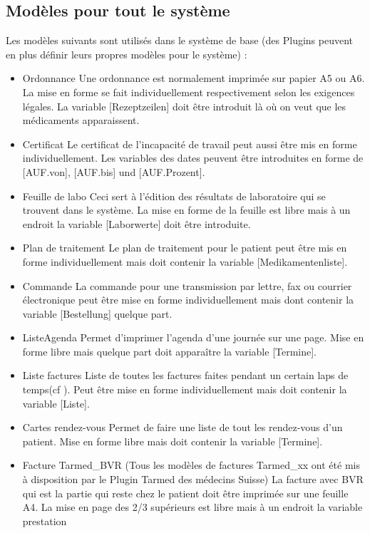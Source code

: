 \subsection{Modèles pour tout le système}
\label{systemvorlagen}
Les modèles suivants sont utilisés dans le système de base (des Plugins peuvent en plus définir leurs propres modèles pour le système) :
\begin{itemize}

  \item {Ordonnance} Une ordonnance est normalement imprimée sur papier A5 ou A6. La mise en forme se fait individuellement respectivement selon les exigences légales. La variable [Rezeptzeilen] doit être introduit là où on veut que les médicaments apparaissent.
  \item {Certificat} Le certificat de l'incapacité de travail peut aussi être mis en forme individuellement. Les variables des dates peuvent être introduites en forme de  [AUF.von],
  [AUF.bis] und [AUF.Prozent].
  \item {Feuille de labo} Ceci sert à l'édition des résultats de laboratoire qui se trouvent dans le système. La mise en forme de la feuille est libre mais à un endroit la variable [Laborwerte] doit être introduite.
  \item {Plan de traitement } Le plan de traitement pour le patient peut être mis en forme individuellement mais doit contenir la variable [Medikamentenliste].
  \item {Commande} La commande pour une transmission par lettre, fax ou courrier électronique peut être mise en forme individuellement mais dont contenir la variable [Bestellung] quelque part.
  \item {ListeAgenda} Permet d'imprimer l'agenda d'une journée sur une page. Mise en forme libre mais quelque part doit apparaître la variable [Termine].
  \item {Liste factures } Liste de toutes les factures faites pendant un certain laps de temps(cf \pageref{fig:konnd}). Peut être mise en forme individuellement mais doit contenir la variable [Liste].
  \item {Cartes rendez-vous } Permet de faire une liste de tout les rendez-vous d'un patient. Mise en forme libre mais doit contenir la variable [Termine].
  \item {Facture Tarmed\_BVR} (Tous les modèles de factures Tarmed\_xx ont été mis à disposition par le Plugin Tarmed des médecins Suisse) La facture avec BVR qui est la partie qui reste chez le patient doit être imprimée sur une feuille A4. La mise en page des 2/3 supérieurs est libre mais à un endroit la variable prestation

\end{itemize}
